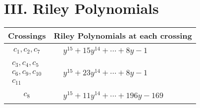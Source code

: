 \documentclass[1p]{elsarticle_modified}
\theoremstyle{definition}
\begin{document}
\centering \section*{ III. Riley Polynomials}
\begin{tabular}{m{50pt}|m{274pt}}
Crossings & \hspace{64pt}Riley Polynomials at each crossing \\
\hline $$\begin{aligned}c_{1},c_{2},c_{7}\end{aligned}$$&$\begin{aligned}
&y^{15}+15 y^{14}+\cdots+8 y-1
\end{aligned}$\\
\hline $$\begin{aligned}c_{3},c_{4},c_{5}\\c_{6},c_{9},c_{10}\\c_{11}\end{aligned}$$&$\begin{aligned}
&y^{15}+23 y^{14}+\cdots+8 y-1
\end{aligned}$\\
\hline $$\begin{aligned}c_{8}\end{aligned}$$&$\begin{aligned}
&y^{15}+11 y^{14}+\cdots+196 y-169
\end{aligned}$\\
\hline
\end{tabular}
\vskip 2pc
\end{document}
